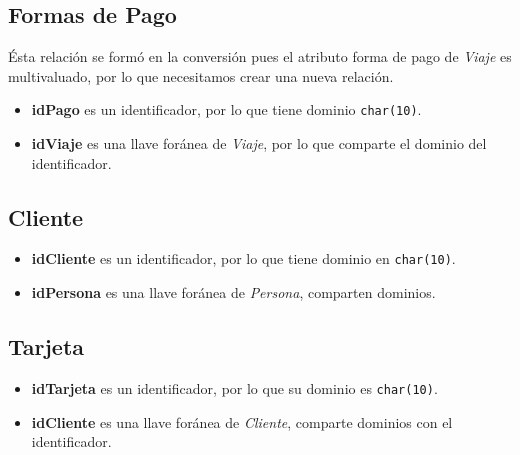 \documentclass[11pt]{article}
\begin{document}
\subsection*{Formas de Pago}
\label{sec:orgc0a70e7}
Ésta relación se formó en la conversión pues el atributo forma de pago de \emph{Viaje} es multivaluado, por lo que
necesitamos crear una nueva relación.
\begin{itemize}
\item \textbf{idPago} es un identificador, por lo que tiene dominio \texttt{char(10)}.
\item \textbf{idViaje} es una llave foránea de \emph{Viaje}, por lo que comparte el dominio del identificador.
\end{itemize}
\subsection*{Cliente}
\label{sec:org9c372e5}
\begin{itemize}
\item \textbf{idCliente} es un identificador, por lo que tiene dominio en \texttt{char(10)}.
\item \textbf{idPersona} es una llave foránea de \emph{Persona}, comparten dominios.
\end{itemize}
\subsection*{Tarjeta}
\label{sec:org542e61c}
\begin{itemize}
\item \textbf{idTarjeta} es un identificador, por lo que su dominio es \texttt{char(10)}.
\item \textbf{idCliente} es una llave foránea de \emph{Cliente}, comparte dominios con el identificador.
\end{itemize}
\end{document}
